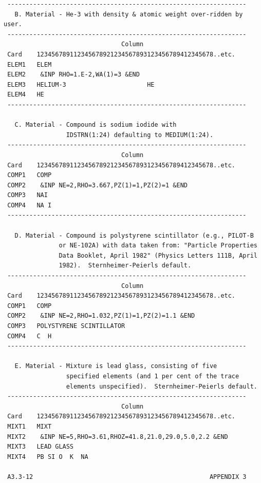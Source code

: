 \newpage  {} \begin{verbatim}
 -----------------------------------------------------------------
   B. Material - He-3 with density & atomic weight over-ridden by user.
 -----------------------------------------------------------------
                                Column
 Card    123456789112345678921234567893123456789412345678..etc.
 ELEM1   ELEM
 ELEM2    &INP RHO=1.E-2,WA(1)=3 &END
 ELEM3   HELIUM-3                      HE
 ELEM4   HE
 -----------------------------------------------------------------

   C. Material - Compound is sodium iodide with
                 IDSTRN(1:24) defaulting to MEDIUM(1:24).
 -----------------------------------------------------------------
                                Column
 Card    123456789112345678921234567893123456789412345678..etc.
 COMP1   COMP
 COMP2    &INP NE=2,RHO=3.667,PZ(1)=1,PZ(2)=1 &END
 COMP3   NAI
 COMP4   NA I
 -----------------------------------------------------------------

   D. Material - Compound is polystyrene scintillator (e.g., PILOT-B 
               or NE-102A) with data taken from: "Particle Properties
               Data Booklet, April 1982" (Physics Letters 111B, April
               1982).  Sternheimer-Peierls default.
 -----------------------------------------------------------------
                                Column
 Card    123456789112345678921234567893123456789412345678..etc.
 COMP1   COMP
 COMP2    &INP NE=2,RHO=1.032,PZ(1)=1,PZ(2)=1.1 &END
 COMP3   POLYSTYRENE SCINTILLATOR
 COMP4   C  H
 -----------------------------------------------------------------

   E. Material - Mixture is lead glass, consisting of five
                 specified elements (and 1 per cent of the trace
                 elements unspecified).  Sternheimer-Peierls default.
 -----------------------------------------------------------------
                                Column
 Card    123456789112345678921234567893123456789412345678..etc.
 MIXT1   MIXT
 MIXT2    &INP NE=5,RHO=3.61,RHOZ=41.8,21.0,29.0,5.0,2.2 &END
 MIXT3   LEAD GLASS
 MIXT4   PB SI O  K  NA
 
 A3.3-12                                                APPENDIX 3
\end{verbatim} 
